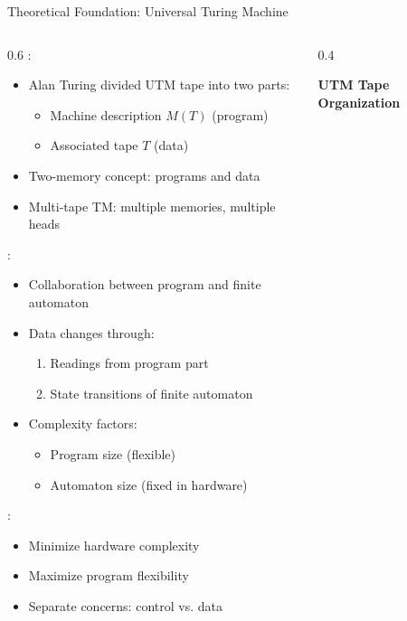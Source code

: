 \begin{frame}{Theoretical Foundation: Universal Turing Machine}
\begin{columns}
\begin{column}{0.6\textwidth}
:
\begin{itemize}
\item Alan Turing divided UTM tape into two parts:
\begin{itemize}
\item Machine description $M(T)$ (program)
\item Associated tape $T$ (data)
\end{itemize}
\item Two-memory concept: programs and data
\item Multi-tape TM: multiple memories, multiple heads
\end{itemize}

\vspace{0.3cm}
:
\begin{itemize}
\item Collaboration between program and finite automaton
\item Data changes through:
\begin{enumerate}
\item Readings from program part
\item State transitions of finite automaton
\end{enumerate}
\item Complexity factors:
\begin{itemize}
\item Program size (flexible)
\item Automaton size (fixed in hardware)
\end{itemize}
\end{itemize}

\vspace{0.3cm}
:
\begin{itemize}
\item Minimize hardware complexity
\item Maximize program flexibility
\item Separate concerns: control vs. data
\end{itemize}
\end{column}
\begin{column}{0.4\textwidth}
\begin{center}
\textbf{UTM Tape Organization}
\vspace{0.3cm}


\end{center}
\end{column}
\end{columns}
\end{frame}
